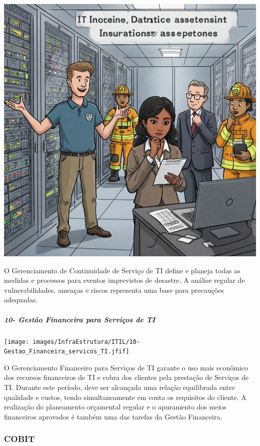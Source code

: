 \documentclass[
]{book}
\begin{document}
\includegraphics{images/InfraEstrutura/ITIL/09-Gestao_de_Continuidade_de_servicos_deTI.jpg}

O Gerenciamento de Continuidade de Serviço de TI define e planeja todas as medidas e processos para eventos imprevistos de desastre. A análise regular de vulnerabilidades, ameaças e riscos representa uma base para precauções adequadas.

\subparagraph{10- Gestão Financeira para Serviços de TI}\label{gestuxe3o-financeira-para-serviuxe7os-de-ti}

\texttt{[image: images/InfraEstrutura/ITIL/10-Gestao\_Financeira\_servicos\_TI.jfif]}

O Gerenciamento Financeiro para Serviços de TI garante o uso mais econômico dos recursos financeiros de TI e cobra dos clientes pela prestação de Serviços de TI. Durante este período, deve ser alcançada uma relação equilibrada entre qualidade e custos, tendo simultaneamente em conta os requisitos do cliente. A realização do planeamento orçamental regular e o apuramento dos meios financeiros aprovados é também uma das tarefas da Gestão Financeira.

\subsubsection{COBIT}\label{cobit}
\end{document}
